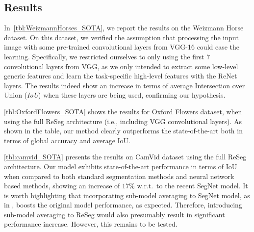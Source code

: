 \subsection{Results}

In~\autoref{tbl:WeizmannHorses_SOTA}, we report the results on the Weizmann
Horse dataset. On this dataset, we verified the assumption that processing
the input image with some pre-trained convolutional layers from VGG-16 could
ease the learning. Specifically, we restricted ourselves to only using the
first $7$ convolutional layers from VGG, as we only intended to extract some
low-level generic features and learn the task-specific high-level features with
the ReNet layers. The results indeed show an increase in terms of average Intersection
over Union (\emph{IoU}) when these layers are being used, confirming our
hypothesis.

\autoref{tbl:OxfordFlowers_SOTA} shows the results for Oxford Flowers
dataset, when using the full ReSeg architecture (i.e., including VGG convolutional layers).
As shown in the table, our method clearly outperforms the
state-of-the-art both in terms of global accuracy and average IoU.

\autoref{tbl:camvid_SOTA} presents the results on CamVid dataset using the full
ReSeg architecture. Our model exhibits state-of-the-art performance in terms of
IoU when compared to both standard segmentation methods and neural network
based methods, showing an increase of $17\%$ w.r.t.\ to the recent SegNet
model. It is worth highlighting that incorporating sub-model averaging to
SegNet model, as in \cite{Kendall2015bayesiansegnet}, boosts the original model
performance, as expected. Therefore, introducing sub-model averaging to ReSeg
would also presumably result in significant performance increase.  However,
this remains to be tested.



